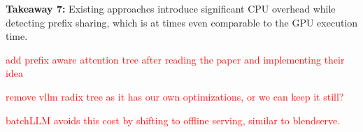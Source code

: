 \textbf{Takeaway 7:} Existing approaches introduce significant CPU overhead while detecting prefix sharing, which is at times even comparable to the GPU execution time. 
\begin{table}[t]
\centering
\small
{}
\caption{Comparison of scheduling policies}
\label{tab:cost_schedulers}
\end{table}

\textcolor{red}{add prefix aware attention tree after reading the paper and implementing their idea}

\textcolor{red}{remove vllm radix tree as it has our own optimizations, or we can keep it still?}

\textcolor{red}{batchLLM avoids this cost by shifting to offline serving, similar to blendserve.}


